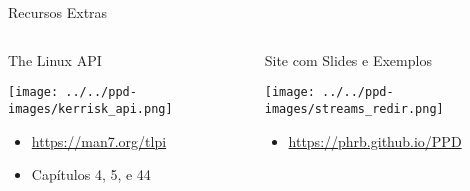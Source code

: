 \documentclass[10pt, compress, aspectratio=169, xcolor={table,usenames,dvipsnames}]{beamer}
\begin{document}
\begin{frame}[label={sec:orgc9fc546}]{Recursos Extras}
\begin{columns}
\begin{column}{0.5\columnwidth}
\begin{block}{The Linux API}
\begin{center}
\texttt{[image: ../../ppd-images/kerrisk\_api.png]}
\end{center}

\begin{itemize}
\item \url{https://man7.org/tlpi}
\item Capítulos 4, 5, e 44
\end{itemize}
\end{block}
\end{column}

\begin{column}{0.5\columnwidth}
\begin{block}{Site com Slides e Exemplos}
\begin{center}
\texttt{[image: ../../ppd-images/streams\_redir.png]}
\end{center}

\begin{itemize}
\item \url{https://phrb.github.io/PPD}
\end{itemize}
\end{block}
\end{column}
\end{columns}
\end{frame}
\end{document}

